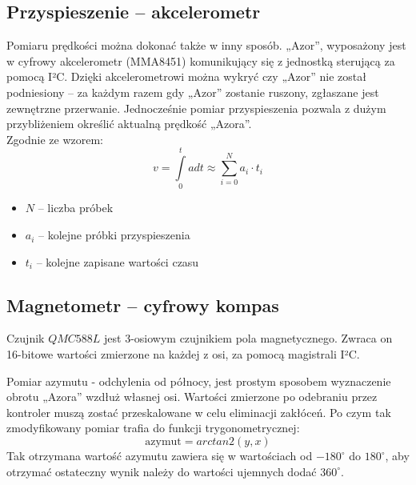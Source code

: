     \subsection{Przyspieszenie -- akcelerometr}
        \tab Pomiaru prędkości można dokonać także w inny sposób.
        „Azor”, wyposażony jest w cyfrowy akcelerometr (MMA8451) komunikujący się z jednostką sterującą za pomocą I²C.
        Dzięki akcelerometrowi można wykryć czy „Azor” nie został podniesiony -- za każdym razem gdy „Azor” zostanie ruszony, zgłaszane jest zewnętrzne przerwanie. 
        Jednocześnie pomiar przyspieszenia pozwala z dużym przybliżeniem określić aktualną prędkość „Azora”.\\
        Zgodnie ze wzorem:
        \begin{equation}
            v = \int\limits_{0}^{t} a dt \approx \sum_{i = 0}^{N} a_i \cdot t_i
        \end{equation}
        \begin{itemize}
            \item $N$ -- liczba próbek
            \item $a_i$ -- kolejne próbki przyspieszenia
            \item $t_i$ -- kolejne zapisane wartości czasu
        \end{itemize}

    \subsection{Magnetometr -- cyfrowy kompas}\label{section:measure:azimuth}
        \tab Czujnik $QMC588L$ jest 3-osiowym czujnikiem pola magnetycznego. Zwraca on 16-bitowe wartości zmierzone na każdej z osi, za pomocą magistrali I²C.
        
        Pomiar azymutu - odchylenia od północy, jest prostym sposobem wyznaczenie obrotu „Azora” wzdłuż własnej osi.
        Wartości zmierzone po odebraniu przez kontroler muszą zostać przeskalowane w celu eliminacji zakłóceń.
        Po czym tak zmodyfikowany pomiar trafia do  funkcji trygonometrycznej:
        \begin{equation}
            \text{azymut} = arctan2(y, x)
        \end{equation}
        Tak otrzymana wartość azymutu zawiera się w wartościach od $-180^\circ$ do $180^\circ$, aby otrzymać ostateczny wynik należy do wartości ujemnych dodać $360^\circ$.
